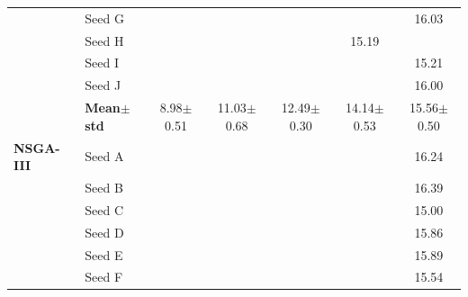 \begin{table}[H]
{\begin{tabular}{@{}llccccc@{}}
  & Seed G & \cellcolor{RoyalBlue!10}{\small 8.59} & \cellcolor{RoyalBlue!10}{\small 10.69} & \cellcolor{RoyalBlue!10}{\small 12.29} & \cellcolor{RoyalBlue!10}{\small 14.58} & {\small\color{gray!60!black}16.03} \\
  & Seed H & \cellcolor{RoyalBlue!10}{\small 9.51} & \cellcolor{RoyalBlue!10}{\small 10.72} & \cellcolor{RoyalBlue!10}{\small 12.87} & {\small\color{gray!60!black}15.19} & \cellcolor{RoyalBlue!10}{\small 14.53} \\
  & Seed I & \cellcolor{RoyalBlue!10}{\small 10.08} & \cellcolor{RoyalBlue!10}{\small 11.75} & \cellcolor{RoyalBlue!10}{\small 12.01} & \cellcolor{RoyalBlue!10}{\small 13.99} & {\small\color{gray!60!black}15.21} \\
  & Seed J & \cellcolor{RoyalBlue!10}{\small 8.87} & \cellcolor{RoyalBlue!10}{\small 11.65} & \cellcolor{RoyalBlue!10}{\small 12.10} & \cellcolor{RoyalBlue!10}{\small 13.62} & {\small\color{gray!60!black}16.00} \\
 & \textbf{Mean$\pm$std} & \cellcolor{RoyalBlue!20}8.98$\pm$0.51 & \cellcolor{RoyalBlue!20}11.03$\pm$0.68 & \cellcolor{RoyalBlue!20}12.49$\pm$0.30 & \cellcolor{RoyalBlue!20}14.14$\pm$0.53 & \cellcolor{red!12}15.56$\pm$0.50 \\
\midrule
 \textbf{NSGA-III} & Seed A & \cellcolor{RoyalBlue!10}{\small 8.35} & \cellcolor{RoyalBlue!10}{\small 11.40} & \cellcolor{RoyalBlue!10}{\small 12.56} & \cellcolor{RoyalBlue!10}{\small 14.59} & {\small\color{gray!60!black}16.24} \\
  & Seed B & \cellcolor{RoyalBlue!10}{\small 7.61} & \cellcolor{RoyalBlue!10}{\small 12.24} & \cellcolor{RoyalBlue!10}{\small 13.17} & \cellcolor{RoyalBlue!10}{\small 14.11} & {\small\color{gray!60!black}16.39} \\
  & Seed C & \cellcolor{RoyalBlue!10}{\small 10.36} & \cellcolor{RoyalBlue!10}{\small 11.16} & \cellcolor{RoyalBlue!10}{\small 13.11} & \cellcolor{RoyalBlue!10}{\small 14.98} & {\small\color{gray!60!black}15.00} \\
  & Seed D & \cellcolor{RoyalBlue!10}{\small 8.52} & \cellcolor{RoyalBlue!10}{\small 12.16} & \cellcolor{RoyalBlue!10}{\small 11.69} & \cellcolor{RoyalBlue!10}{\small 14.26} & {\small\color{gray!60!black}15.86} \\
  & Seed E & \cellcolor{RoyalBlue!10}{\small 9.67} & \cellcolor{RoyalBlue!10}{\small 11.03} & \cellcolor{RoyalBlue!10}{\small 12.31} & \cellcolor{RoyalBlue!10}{\small 14.50} & {\small\color{gray!60!black}15.89} \\
  & Seed F & \cellcolor{RoyalBlue!10}{\small 8.81} & \cellcolor{RoyalBlue!10}{\small 11.25} & \cellcolor{RoyalBlue!10}{\small 11.95} & \cellcolor{RoyalBlue!10}{\small 14.48} & {\small\color{gray!60!black}15.54} \\

\end{tabular}}
\end{table}
